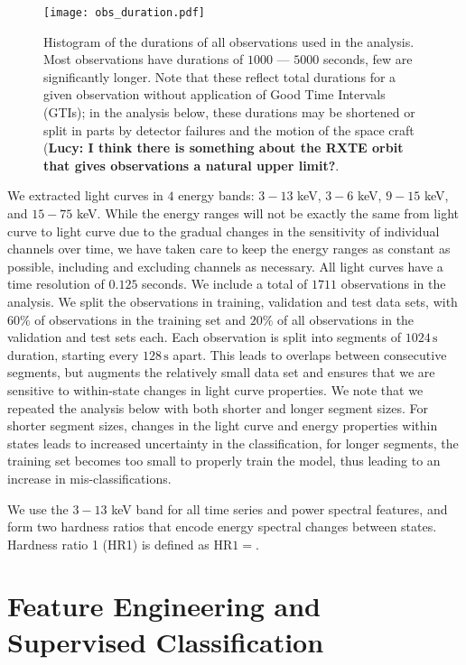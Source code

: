 \documentclass[12pt]{emulateapj}
\begin{document}
\begin{figure}[htbp]
\begin{center}
\texttt{[image: obs\_duration.pdf]}
\caption{Histogram of the durations of all observations used in the analysis. Most observations have durations of $1000$ --- $5000$ seconds, few are significantly longer. Note that these reflect total durations for a given observation without application of Good Time Intervals (GTIs); in the analysis below, these durations may be shortened or split in parts by detector failures and the motion of the space craft ({\bf Lucy: I think there is something about the RXTE orbit that gives observations a natural upper limit?}.}
\label{fig:asm_total}
\end{center}
\end{figure}


We extracted light curves in $4$ energy bands: $3 - 13$ keV, $3 - 6$ keV, $9 - 15$ keV, and $15 - 75$ keV. While the energy ranges will not be exactly the same from light curve to light curve due to the gradual changes in the sensitivity of individual channels over time, we have taken care to keep the energy ranges as constant as possible, including and excluding channels as necessary. All light curves have a time resolution of $0.125$ seconds. We include a total of $1711$ observations in the analysis. 
We split the observations in training, validation and test data sets, with $60\%$ of observations in the training set and $20\%$ of all observations in the validation and test sets each. 
Each observation is split into segments of $1024\,\mathrm{s}$ duration, starting every $128\,\mathrm{s}$ apart. This leads to overlaps between consecutive segments, but augments the relatively small data set and ensures that we are sensitive to within-state changes in light curve properties. We note that we repeated the analysis below with both shorter and longer segment sizes. For shorter segment sizes, changes in the light curve and energy properties within states leads to increased uncertainty in the classification, for longer segments, the training set becomes too small to properly train the model, thus leading to an increase in mis-classifications.

We use the $3 - 13$ keV band for all time series and power spectral features, and form two hardness ratios that encode energy spectral changes between states. Hardness ratio 1 (HR1) is defined as $\mathrm{HR}1 = $.

\section{Feature Engineering and Supervised Classification}
\end{document}
